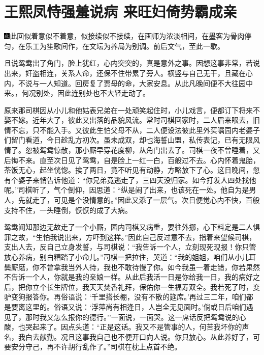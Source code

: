 \chapter{王熙凤恃强羞说病 来旺妇倚势霸成亲}

{\includegraphics[width=3mm]{../Images/00005}\kaishu 此回似着意似不着意，似接续似不接续，在画师为浓淡相间，在墨客为骨肉停匀，在乐工为笙歌间作，在文坛为养局为别调。前后文气，至此一歇。}

且说鸳鸯出了角门，脸上犹红，心内突突的，真是意外之事。因想这事非常，若说出来，奸盗相连，关系人命，还保不住带累了旁人。横竖与自己无干，且藏在心内，不说与一人知道。回房复了贾母的命，大家安息。从此凡晚间便不大往园中来。，何况别处，因此连别处也不大轻走动了。

原来那司棋因从小儿和他姑表兄弟在一处顽笑起住时，小儿戏言，便都订下将来不娶不嫁。近年大了，彼此又出落的品貌风流。常时司棋回家时，二人眉来眼去，旧情不忘，只不能入手。又彼此生怕父母不从，二人便设法彼此里外买嘱园内老婆子们留门看道，今日趁乱方初次。虽未成双，却也海誓山盟，私传表记，已有无限风情了。忽被鸳鸯惊散，那小厮早穿花度柳，从角门出去了。司棋一夜不曾睡着，又后悔不来。直至次日见了鸳鸯，自是脸上一红一白，百般过不去。心内怀着鬼胎，茶饭无心，起坐恍惚。挨了两日，竟不听见有动静，方略放下了心。这日晚间，忽有个婆子来悄告诉他道：``你兄弟竟逃走了，三四天没归家。如今打发人四处找他呢。''司棋听了，气个倒仰，因思道：``纵是闹了出来，也该死在一处。他自为是男人，先就走了，可见是个没情意的。''因此又添了一层气。次日便觉心内不快，百般支持不住，一头睡倒，恹恹的成了大病。

鸳鸯闻知那边无故走了一个小厮，园内司棋又病重，要往外挪，心下料定是二人惧罪之故，``生怕我说出来，方吓到这样。''因此自己反过意不去，指着来望候司棋，支出人去，反自己立身发誓，与司棋说：``我告诉一个人，立刻现死现报！你只管放心养病，别白糟踏了小命儿。''司棋一把拉住，哭道：``我的姐姐，咱们从小儿耳鬓厮磨，你不曾拿我当外人待，我也不敢待慢了你。如今我虽一着走错，你若果然不告诉一个人，你就是我的亲娘一样。从此后我活一日是你给我一日，我的病好之后，把你立个长生牌位，我天天焚香礼拜，保佑你一生福寿双全。我若死了时，变驴变狗报答你。再俗语说：`千里搭长棚，没有不散的筵席。'再过三二年，咱们都是要离这里的。俗语又说：`浮萍尚有相逢日，人岂全无见面时。'倘或日后咱们遇见了，那时我又怎么报你的德行。''一面说，一面哭。这一席话反把鸳鸯说的心酸，也哭起来了。因点头道：``正是这话。我又不是管事的人，何苦我坏你的声名，我白去献勤。况且这事我自己也不便开口向人说。你只放心。从此养好了，可要安分守己，再不许胡行乱作了。''司棋在枕上点首不绝。

